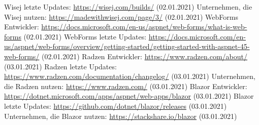 \documentclass[ngerman]{article}
\begin{document}
\begin{thebibliography}{9}
        Wisej letzte Updates: \url{https://wisej.com/builds/} (02.01.2021)
        Unternehmen, die Wisej nutzen: \url{https://madewithwisej.com/page/3/} (02.01.2021)
        WebForms Entwickler: \url{https://docs.microsoft.com/en-us/aspnet/web-forms/what-is-web-forms} (02.01.2021)
        WebForms letzte Updates: \url{https://docs.microsoft.com/en-us/aspnet/web-forms/overview/getting-started/getting-started-with-aspnet-45-web-forms/} (02.01.2021)
        Radzen Entwickler: \url{https://www.radzen.com/about/} (03.01.2021)
        Radzen letzte Updates: \url{https://www.radzen.com/documentation/changelog/} (03.01.2021)
        Unternehmen, die Radzen nutzen: \url{https://www.radzen.com/} (03.01.2021)
        Blazor Entwickler: \url{https://dotnet.microsoft.com/apps/aspnet/web-apps/blazor} (03.01.2021)
        Blazor letzte Updates: \url{https://github.com/dotnet/blazor/releases} (03.01.2021)
        Unternehmen, die Blazor nutzen: \url{https://stackshare.io/blazor} (03.01.2021)
    \end{thebibliography}
\end{document}
